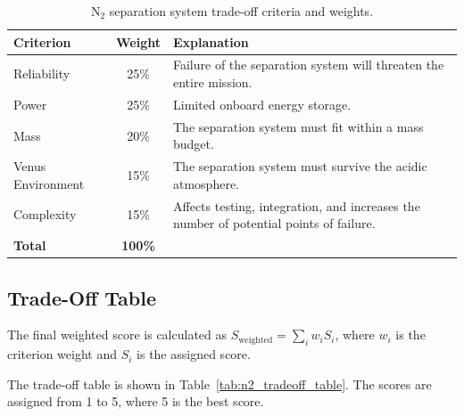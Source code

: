 \begin{table}[H]
\centering
\caption{N$_2$ separation system trade-off criteria and weights.}
\label{tab:n2_trade_criteria}
\footnotesize
\renewcommand{\arraystretch}{1.12}
\setlength{\tabcolsep}{5pt}
\begin{tabularx}{\textwidth}{@{}p{} c X@{}}
\toprule
\textbf{Criterion} & \textbf{Weight} & \textbf{Explanation} \\
\midrule
Reliability 
& 25\% 
& Failure of the separation system will threaten the entire mission. \\

Power 
& 25\%  
& Limited onboard energy storage. \\

Mass 
& 20\%  
& The separation system must fit within a mass budget. \\

Venus Environment 
& 15\%  
& The separation system must survive the acidic atmosphere. \\

Complexity 
& 15\%  
& Affects testing, integration, and increases the number of potential points of failure. \\
\midrule
\textbf{Total} & \textbf{100\%} & \\
\bottomrule
\end{tabularx}
\end{table}

\subsection{Trade-Off Table}
\label{subsec:n2_trade_table}

The final weighted score is calculated as $S_{\mathrm{weighted}} = \sum_i w_i S_i$, where $w_i$ is the criterion weight and $S_i$ is the assigned score.

The trade-off table is shown in Table~\ref{tab:n2_tradeoff_table}. The scores are assigned from 1 to 5, where 5 is the best score.


